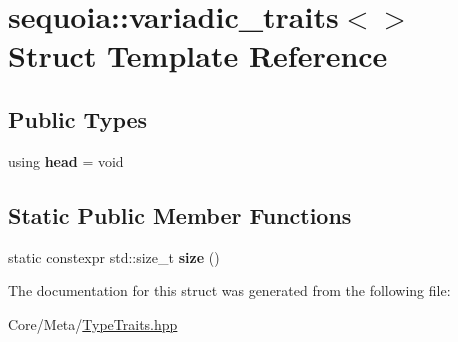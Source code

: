 \hypertarget{structsequoia_1_1variadic__traits_3_4}{}\section{sequoia\+::variadic\+\_\+traits$<$$>$ Struct Template Reference}
\label{structsequoia_1_1variadic__traits_3_4}
\subsection*{Public Types}
\begin{DoxyCompactItemize}
\item 
\mbox{\label{structsequoia_1_1variadic__traits_3_4_a29d152c17e0f5e68216429946d4e9ebb}} 
using {\bfseries head} = void
\end{DoxyCompactItemize}
\subsection*{Static Public Member Functions}
\begin{DoxyCompactItemize}
\item 
\mbox{\label{structsequoia_1_1variadic__traits_3_4_aa2caabc2ada16af18f2751d496dff6d8}} 
static constexpr std\+::size\+\_\+t {\bfseries size} ()
\end{DoxyCompactItemize}


The documentation for this struct was generated from the following file\+:\begin{DoxyCompactItemize}
\item 
Core/\+Meta/\mbox{\hyperlink{_type_traits_8hpp}{Type\+Traits.\+hpp}}\end{DoxyCompactItemize}
